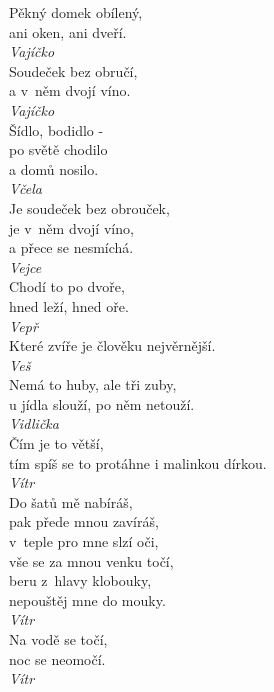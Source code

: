 \begin{multicols}{3}
\noindent
Pěkný domek obílený,\\
ani oken, ani dveří.\\[1 mm]
{\sl Vajíčko}\\

\noindent
Soudeček bez obručí,\\
a v~něm dvojí víno.\\[1 mm]
{\sl Vajíčko}\\

\noindent
Šídlo, bodidlo -\\
po světě chodilo\\
a domů nosilo.\\[1 mm]
{\sl Včela}\\

\noindent
Je soudeček bez obrouček,\\
je v~něm dvojí víno,\\
a přece se nesmíchá.\\[1 mm]
{\sl Vejce}\\

\noindent
Chodí to po dvoře,\\
hned leží, hned oře.\\[1 mm]
{\sl Vepř}\\

\noindent
Které zvíře je člověku nejvěrnější.\\[1 mm]
{\sl Veš}\\

\noindent
Nemá to huby, ale tři zuby,\\
u jídla slouží, po něm netouží.\\[1 mm]
{\sl Vidlička}\\

\noindent
Čím je to větší,\\
tím spíš se to protáhne i malinkou dírkou.\\[1 mm]
{\sl Vítr}\\

\noindent
Do šatů mě nabíráš,\\
pak přede mnou zavíráš,\\
v~teple pro mne slzí oči,\\
vše se za mnou venku točí,\\
beru z~hlavy klobouky,\\
nepouštěj mne do mouky.\\[1 mm]
{\sl Vítr}\\

\noindent
Na vodě se točí,\\
noc se neomočí.\\[1 mm]
{\sl Vítr}\\


\end{multicols}
